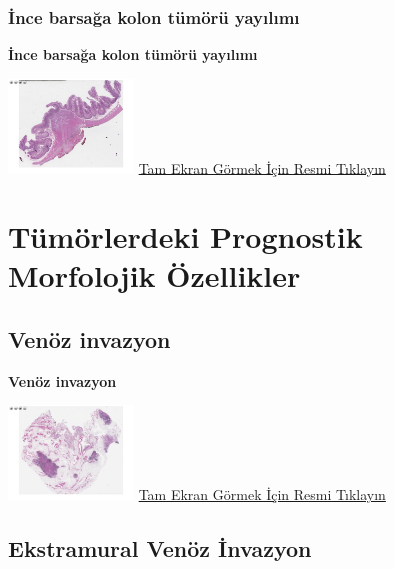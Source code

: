 \documentclass[
  letterpaper,
  DIV=11,
  numbers=noendperiod]{scrreprt}
\begin{document}
\hypertarget{sec-ince-barsak-kolon-tumor-yayilimi}{%
\section{İnce barsağa kolon tümörü
yayılımı}\label{sec-ince-barsak-kolon-tumor-yayilimi}}

\textbf{İnce barsağa kolon tümörü yayılımı}

\href{https://images.patolojiatlasi.com/tumor-spread/HE-small-intestine.html}{\includegraphics[width=0.25\textwidth,height=\textheight]{./screenshots/thumbnail_tumor-spread-small-intestine.png}}
\href{https://images.patolojiatlasi.com/tumor-spread/HE-small-intestine.html}{Tam
Ekran Görmek İçin Resmi Tıklayın}

\part{Tümörlerdeki Prognostik Morfolojik Özellikler}

\hypertarget{sec-venoz-invazyon}{%
\chapter{Venöz invazyon}\label{sec-venoz-invazyon}}

\textbf{Venöz invazyon}

\href{https://images.patolojiatlasi.com/venous-invasion/HE.html}{\includegraphics[width=0.25\textwidth,height=\textheight]{./screenshots/thumbnail_venous-invasion.png}}
\href{https://images.patolojiatlasi.com/venous-invasion/HE.html}{Tam
Ekran Görmek İçin Resmi Tıklayın}

\hypertarget{sec-ekstramural-venoz-invazyon}{%
\chapter{Ekstramural Venöz
İnvazyon}\label{sec-ekstramural-venoz-invazyon}}
\end{document}
